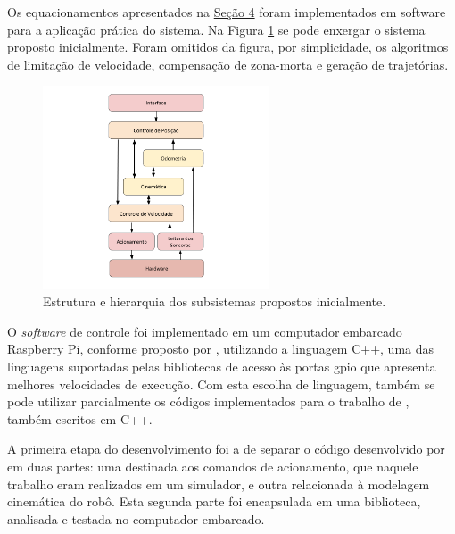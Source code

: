 Os equacionamentos apresentados na \hyperref[sec:teorico]{Seção 4} foram implementados em software para a aplicação prática do sistema. Na Figura \ref{fig:sistema} se pode enxergar o sistema proposto inicialmente. Foram omitidos da figura, por simplicidade, os algoritmos de limitação de velocidade, compensação de zona-morta e geração de trajetórias.

\begin{figure}[h]
  \centering
  \includegraphics[width = 0.6\textwidth]{imagens/sistema}
  \caption{Estrutura e hierarquia dos subsistemas propostos inicialmente.}
  \label{fig:sistema}
\end{figure}

O \textit{software} de controle foi implementado em um computador embarcado Raspberry Pi, conforme proposto por \citet{ritter2016modelagem}, utilizando a linguagem C++, uma das linguagens suportadas pelas bibliotecas de acesso às portas \acrlong{gpio} que apresenta melhores velocidades de execução. Com esta escolha de linguagem, também se pode utilizar parcialmente os códigos implementados para o trabalho de \citet{ritter2016modelagem}, também escritos em C++.




A primeira etapa do desenvolvimento foi a de separar o código desenvolvido por \citet{ritter2016modelagem} em duas partes: uma destinada aos comandos de acionamento, que naquele trabalho eram realizados em um simulador, e outra relacionada à modelagem cinemática do robô. Esta segunda parte foi encapsulada em uma biblioteca, analisada e testada no computador embarcado.

